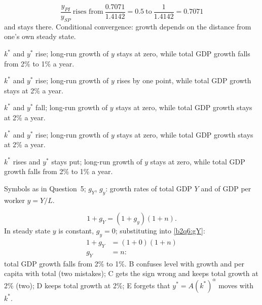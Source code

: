 \begin{sol}
\[
\frac{y_{PI}}{y_{SP}}\ \text{rises from}\ \frac{0.7071}{1.4142}=0.5\ \text{to}\ \frac{1}{1.4142}=0.7071
\]
and stays there. Conditional convergence: growth depends on the distance from one's own steady state.
\end{sol}

\begin{alternativas}
\item $k^*$ and $y^*$ rise; long-run growth of $y$ stays at zero, while total GDP growth falls from 2\% to 1\% a year.
\item $k^*$ and $y^*$ rise; long-run growth of $y$ rises by one point, while total GDP growth stays at 2\% a year.
\item $k^*$ and $y^*$ fall; long-run growth of $y$ stays at zero, while total GDP growth stays at 2\% a year.
\item $k^*$ and $y^*$ rise; long-run growth of $y$ stays at zero, while total GDP growth stays at 2\% a year.
\item $k^*$ rises and $y^*$ stays put; long-run growth of $y$ stays at zero, while total GDP growth falls from 2\% to 1\% a year.
\end{alternativas}
\begin{sol}
\begin{notacao}
\item Symbols as in Question~5; $g_Y$, $g_y$: growth rates of total GDP $Y$ and of GDP per worker $y=Y/L$.
\end{notacao}
\begin{equation}
1+g_Y=(1+g_y)(1+n). \label{b2q6:gY}
\end{equation}
In steady state $y$ is constant, $g_y=0$; substituting into \eqref{b2q6:gY}:
\begin{align*}
1+g_Y&=(1+0)(1+n)\\
g_Y&=n:
\end{align*}
total GDP growth falls from 2\% to 1\%. B confuses level with growth and
per capita with total (two mistakes); C gets the sign wrong and keeps total growth at 2\% (two); D keeps total growth at 2\%; E forgets that
$y^*=A(k^*)^{\alpha}$ moves with $k^*$.
\end{sol}
